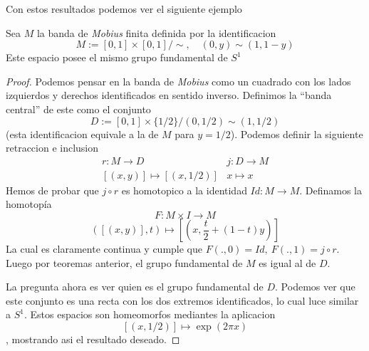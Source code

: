 Con estos resultados podemos ver el siguiente ejemplo
\begin{corolario}
  Sea \(M\) la banda de \emph{Mobius} finita definida por la identificacion
  \[ M := [0,1] \times [0,1] / \sim, \quad (0,y) \sim (1, 1 - y) \]
  Este espacio posee el mismo grupo fundamental de \(S^1\)
\end{corolario}
\begin{proof}
  Podemos pensar en la banda de \emph{Mobius} como un cuadrado con los
  lados izquierdos y derechos identificados en sentido inverso.
  Definimos la ``banda central'' de este como el conjunto
  \[ D := [0,1] \times \{1 / 2\} / (0, 1 / 2) \sim (1,1 / 2) \]
  (esta identificacion equivale a la de \(M\) para \(y = 1/2\)). Podemos
  definir la siguiente retraccion e inclusion
  \[
    \begin{matrix}
      r : M \to D & j : D \to M \\
      [(x,y)] \mapsto [(x, 1/2)] & x \mapsto x
    \end{matrix}
  \]
  Hemos de probar que \(j \circ r\) es homotopico a la identidad \(Id
  : M \to M\). Definamos la homotopía
  \[ F : M \times I \to M \]
  \[ ([(x,y)], t) \mapsto [(x, \frac t 2 + (1-t) y)] \]
  La cual es claramente continua y cumple que \( F(.,0) = Id,\ F(.,1) =
  j \circ r\). Luego por teoremas anterior, el grupo fundamental de
  \(M\) es igual al de \(D\).

  La pregunta ahora es ver quien es el grupo fundamental de \(D\).
  Podemos ver que este conjunto es una recta con los dos extremos
  identificados, lo cual luce similar a \(S^1\). Estos espacios son
  homeomorfos mediantes la aplicacion \[[(x, 1/2)] \mapsto \exp (2 \pi
  x)\], mostrando asi el resultado deseado.
\end{proof}

